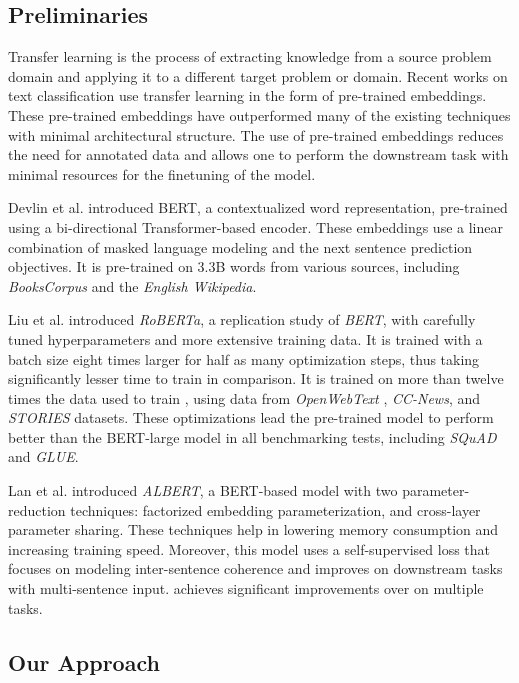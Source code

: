 \documentclass[runningheads]{llncs}
\begin{document}
\subsection{Preliminaries}
Transfer learning is the process of extracting knowledge from a source problem domain and applying it to a different target problem or domain. Recent works on text classification use transfer learning in the form of pre-trained embeddings.\cite{yang2019xlnet,2020roberta,2020albert} These pre-trained embeddings have outperformed many of the existing techniques with minimal architectural structure. The use of pre-trained embeddings reduces the need for annotated data and allows one to perform the downstream task with minimal resources for the finetuning of the model.

Devlin et al.\cite{Devlin2019} introduced BERT, a contextualized word representation, pre-trained using a bi-directional Transformer-based encoder. These embeddings use a linear combination of masked language modeling and the next sentence prediction objectives. It is pre-trained on 3.3B words from various sources, including \textit{BooksCorpus}\cite{zhu2015aligning} and the \textit{English Wikipedia}. 

Liu et al. introduced \textit{RoBERTa}, a replication study of \textit{BERT}, with carefully tuned hyperparameters and more extensive training data\cite{2020roberta}. It is trained with a batch size eight times larger for half as many optimization steps, thus taking significantly lesser time to train in comparison. It is trained on more than twelve times the data used to train , using data from \textit{OpenWebText} \cite{Gokaslan2019OpenWeb}, \textit{CC-News}\cite{CC-News}, and \textit{STORIES}\cite{journals/corr/abs-1806-02847} datasets. These optimizations lead the  pre-trained model to perform better than the BERT-large model in all benchmarking tests, including \textit{SQuAD}\cite{rajpurkar2016squad} and \textit{GLUE}\cite{wang-etal-2018-glue}. 

Lan et al. introduced \textit{ALBERT}, a BERT-based model with two parameter-reduction techniques: factorized embedding parameterization, and cross-layer parameter sharing.\cite{2020albert} These techniques help in lowering memory consumption and increasing training speed. Moreover, this model uses a self-supervised loss that focuses on modeling inter-sentence coherence and improves on downstream tasks with multi-sentence input.  achieves significant improvements over  on multiple tasks.

\subsection{Our Approach}
\end{document}
